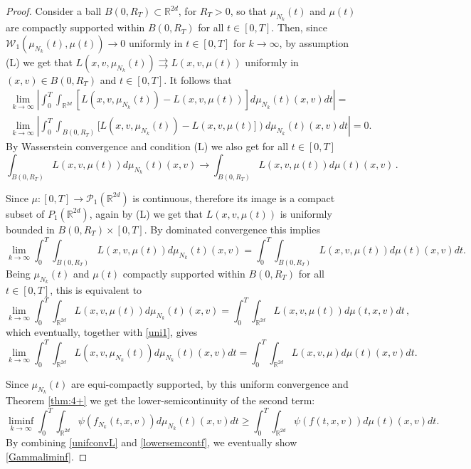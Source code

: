 \documentclass[11pt]{article}
\theoremstyle{plain}
\theoremstyle{definition}
\theoremstyle{remark}
\numberwithin{equation}{section}
\newcommand{\R}{{\mathbb R}}
\begin{document}
\begin{proof}
Consider a ball $B(0,R_T)\subset \R^{2d}$, for $R_T>0$, so that $\mu_{N_k}(t)$ and $\mu(t)$ are compactly supported within $B(0,R_T)$ for all $t\in [0, T]$. Then, since $\mathcal W_1(\mu_{N_k}(t), \mu(t)) \to 0$ uniformly in $t\in [0, T]$ for $k \to \infty$, by assumption (L) we get that $L(x,v,\mu_{N_k}(t)) \rightrightarrows L(x,v,\mu(t))$ uniformly in $(x,v)\in B(0, R_T)$ and $t\in [0, T]$. It follows that
\begin{equation}\label{uni1}
\begin {array}{c}
\displaystyle
\lim_{k \to \infty} \left|\int_0^T \int_{\mathbb R^{2d}} [L(x,v,\mu_{N_k}(t))- L(x,v,\mu(t))] d\mu_{N_k}(t)(x,v)   dt\right|=\\[2pt]
\displaystyle
\lim_{k \to \infty} \left|\int_0^T \int_{B(0,R_T)} [L(x,v,\mu_{N_k}(t))  - L(x,v,\mu(t)]) d\mu_{N_k}(t)(x,v)   dt\right|=0.
\end{array}
\end{equation}
By Wasserstein convergence and condition (L) we also get
for all $t\in [0, T]$
$$
\int_{B(0,R_T)} L(x,v,\mu(t)) d\mu_{N_k}(t)(x,v)\to \int_{B(0,R_T)} L(x,v,\mu(t)) d\mu(t)(x,v)\,.
$$

Since $\mu\colon [0, T]\to \mathcal P_1(\R^{2d})$ is continuous, therefore its image is a compact subset of $P_1(\R^{2d})$, again by (L) we get that $L(x,v,\mu(t))$ is uniformly bounded in $B(0, R_T)\times [0, T]$. By dominated convergence this implies
$$
\lim_{k \to \infty} \int_0^T \int_{B(0,R_T)} L(x,v,\mu(t)) d\mu_{N_k}(t)(x,v)= \int_0^T \int_{B(0, R_T)} L(x,v,\mu(t))d\mu(t)(x,v)  dt.
$$
Being $\mu_{N_k}(t)$ and $\mu(t)$ compactly supported within $B(0,R_T)$ for all $t\in [0, T]$, this is equivalent to
$$
\lim_{k \to \infty} \int_0^T \int_{\R^{2d}} L(x,v,\mu(t)) d\mu_{N_k}(t)(x,v)= \int_0^T \int_{\R^{2d}} L(x,v,\mu(t))d\mu(t,x,v)  dt\,,
$$
which eventually, together with \eqref{uni1}, gives
\begin{equation}\label{unifconvL}
\lim_{k \to \infty} \int_0^T \int_{\mathbb R^{2d}} L(x,v,\mu_{N_k}(t)) d\mu_{N_k}(t)(x,v)  dt = \int_0^T \int_{\mathbb R^{2d}} L(x,v,\mu)d\mu(t)(x,v)  dt.
\end{equation}

Since $\mu_{N_k}(t)$ are equi-compactly supported,  by this uniform convergence and Theorem \ref{thm:4+} we get the lower-semicontinuity of the second term:
\begin{equation}\label{lowersemcontf}
\liminf_{k\to \infty} \int_0^T \int_{\mathbb R^{2d}} \psi(f_{N_k}(t,x,v)) d\mu_{N_k}(t)(x,v) dt \geq \int_0^T \int_{\mathbb R^{2d}} \psi(f(t,x,v)) d\mu(t)(x,v) dt.
\end{equation}
By combining \eqref{unifconvL} and \eqref{lowersemcontf}, we eventually show \eqref{Gammaliminf}. 
\end{proof}
\end{document}
